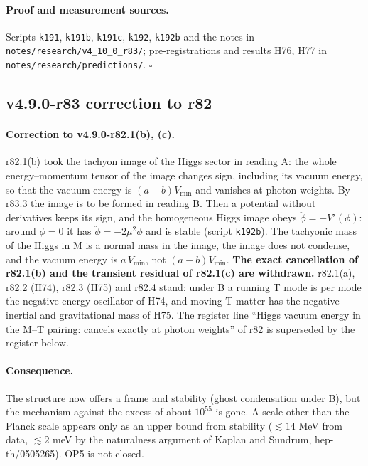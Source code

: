 \paragraph{Proof and measurement sources.}
Scripts \texttt{k191}, \texttt{k191b}, \texttt{k191c}, \texttt{k192}, \texttt{k192b} and the notes in
\texttt{notes/\allowbreak research/\allowbreak v4\_10\_0\_r83/}; pre-registrations and results H76, H77 in
\texttt{notes/\allowbreak research/\allowbreak predictions/}.  \(\square\)

\subsection*{v4.9.0-r83 correction to r82}
\label{subsec:v490-r83-correction}

\paragraph{Correction to v4.9.0-r82.1(b), (c).}
r82.1(b) took the tachyon image of the Higgs sector in reading A: the whole energy--momentum tensor of the image changes sign, including
its vacuum energy, so that the vacuum energy is \((a-b)V_{\min}\) and vanishes at photon weights.  By r83.3 the image is to be formed in
reading B.  Then a potential without derivatives keeps its sign, and the homogeneous Higgs image obeys \(\ddot\phi=+V'(\phi)\): around
\(\phi=0\) it has \(\ddot\phi=-2\mu^2\phi\) and is stable (script \texttt{k192b}).  The tachyonic mass of the Higgs in M is a normal mass in
the image, the image does not condense, and the vacuum energy is \(a\,V_{\min}\), not \((a-b)V_{\min}\).  \textbf{The exact cancellation of
r82.1(b) and the transient residual of r82.1(c) are withdrawn.}  r82.1(a), r82.2 (H74), r82.3 (H75) and r82.4 stand: under B a running T
mode is per mode the negative-energy oscillator of H74, and moving T matter has the negative inertial and gravitational mass of H75.
The register line ``Higgs vacuum energy in the M--T pairing: cancels exactly at photon weights'' of r82 is superseded by the register
below.

\paragraph{Consequence.}
The structure now offers a frame and stability (ghost condensation under B), but the mechanism against the excess of about
\(10^{55}\) is gone.  A scale other than the Planck scale appears only as an upper bound from stability (\(\lesssim14\) MeV from data,
\(\lesssim2\) meV by the naturalness argument of Kaplan and Sundrum, hep-th/0505265).  OP5 is not closed.

